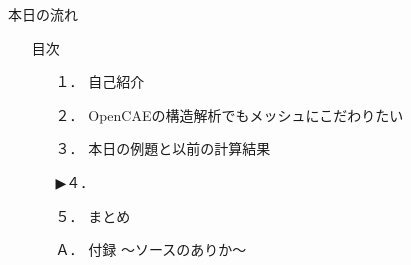 \begin{frame}{本日の流れ}
  \begin{itemize}
      \item[] 目次
      \begin{itemize}[itemsep=1.3ex, leftmargin=1cm]
        \item[１．] 自己紹介
        \item[２．] OpenCAEの構造解析でもメッシュにこだわりたい
        \item[３．] 本日の例題と以前の計算結果
        \item[▶４．] 
        \item[５．] まとめ
        \item[Ａ．] 付録 ～ソースのありか～
      \end{itemize}
  \end{itemize}
\end{frame}
